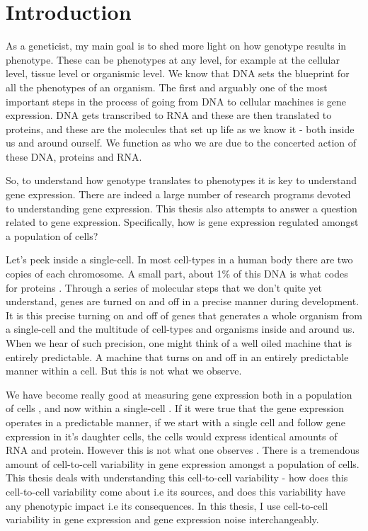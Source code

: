 \chapter{Introduction}
\label{chap:introduction}
\tightlists

As a geneticist, my main goal is to shed more light on how genotype results in phenotype. These can be phenotypes at any level, for example at the cellular level, tissue level or organismic level. We know that DNA sets the blueprint for all the phenotypes of an organism. The first and arguably one of the most important steps in the process of going from DNA to cellular machines is gene expression. DNA gets transcribed to RNA and these are then translated to proteins, and these are the molecules that set up life as we know it - both inside us and around ourself. We function as who we are due to the concerted action of these DNA, proteins and RNA.

So, to understand how genotype translates to phenotypes it is key to understand gene expression. There are indeed a large number of research programs devoted to understanding gene expression. This thesis also attempts to answer a question related to gene expression. Specifically, how is gene expression regulated amongst a population of cells?

Let's peek inside a single-cell. In most cell-types in a human body there are two copies of each chromosome. A small part, about 1\% of this DNA is what codes for proteins \cite {lander2001n}. Through a series of molecular steps that we don't quite yet understand, genes are turned on and off in a precise manner during development. It is this precise turning on and off of genes that generates a whole organism from a single-cell and the multitude of cell-types and organisms inside and around us. When we hear of such precision, one might think of a well oiled machine that is entirely predictable. A machine that turns on and off in an entirely predictable manner within a cell. But this is not what we observe.

We have become really good at measuring gene expression both in a population of cells \cite{bulk rnaseq, }, and now within a single-cell \cite{macosko2015c, flow cyto, xia2019pnasu, raj2006pb}. If it were true that the gene expression operates in a predictable manner, if we start with a single cell and follow gene expression in it's daughter cells, the cells would express identical amounts of RNA and protein. However this is not what one observes \cite{elowitz_stochastic_2002}. There is a tremendous amount of cell-to-cell variability in gene expression amongst a population of cells. This thesis deals with understanding this cell-to-cell variability - how does this cell-to-cell variability come about i.e its sources, and does this variability have any phenotypic impact i.e its consequences. In this thesis, I use cell-to-cell variability in gene expression and gene expression noise interchangeably.

